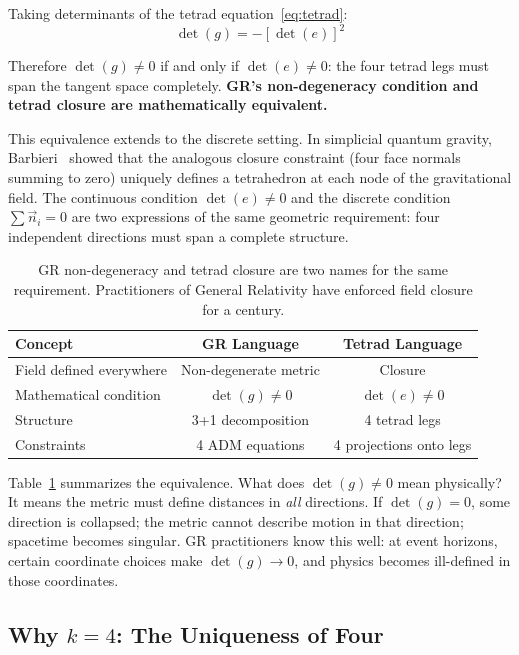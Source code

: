 \documentclass[aps,prd,preprint,superscriptaddress,showpacs,preprintnumbers,amsmath,amssymb,nofootinbib]{revtex4-2}
\begin{document}
Taking determinants of the tetrad equation~\eqref{eq:tetrad}:
\begin{equation}
\det(g) = -[\det(e)]^2
\label{eq:det-relation}
\end{equation}

Therefore $\det(g) \neq 0$ if and only if $\det(e) \neq 0$: the four tetrad legs must span the tangent space completely. \textbf{GR's non-degeneracy condition and tetrad closure are mathematically equivalent.}

This equivalence extends to the discrete setting. In simplicial quantum gravity, Barbieri~\cite{barbieri1998} showed that the analogous closure constraint (four face normals summing to zero) uniquely defines a tetrahedron at each node of the gravitational field. The continuous condition $\det(e) \neq 0$ and the discrete condition $\sum \vec{n}_i = 0$ are two expressions of the same geometric requirement: four independent directions must span a complete structure.

\begin{table}[H]
\centering
\begin{tabular*}{0.95\textwidth}{@{\extracolsep{\fill}} lcc @{}}
\toprule
\textbf{Concept} & \textbf{GR Language} & \textbf{Tetrad Language} \\
\midrule
Field defined everywhere & Non-degenerate metric & Closure \\
Mathematical condition & $\det(g) \neq 0$ & $\det(e) \neq 0$ \\
Structure & 3+1 decomposition & 4 tetrad legs \\
Constraints & 4 ADM equations & 4 projections onto legs \\
\bottomrule
\end{tabular*}
\caption{GR non-degeneracy and tetrad closure are two names for the same requirement. Practitioners of General Relativity have enforced field closure for a century.}
\label{tab:closure}
\end{table}

Table~\ref{tab:closure} summarizes the equivalence. What does $\det(g) \neq 0$ mean physically? It means the metric must define distances in \emph{all} directions. If $\det(g) = 0$, some direction is collapsed; the metric cannot describe motion in that direction; spacetime becomes singular. GR practitioners know this well: at event horizons, certain coordinate choices make $\det(g) \to 0$, and physics becomes ill-defined in those coordinates.

\subsection{Why $k=4$: The Uniqueness of Four}
\label{subsec:k4}
\end{document}
